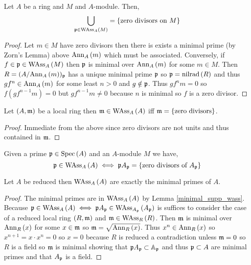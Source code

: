 \documentclass[12pt]{article}
\begin{document}
\begin{lemma}
Let $A$ be a ring and $M$ and $A$-module. Then,
\[ \bigcup_{\mathfrak{p} \in \mathrm{WAss}_{A}\left(M \right)} = \{ \text{zero divisors on } M \} \]
\end{lemma}

\begin{proof}
Let $m \in M$ have zero divisors then there is exists a minimal prime (by Zorn's Lemma) above $\mathrm{Ann}_{A}\left(m\right)$ which must be associated. Conversely, if $f \in \mathfrak{p} \in \mathrm{WAss}_{A}\left(M \right)$ then $\mathfrak{p}$ is minimal over $\mathrm{Ann}_{A}\left(m\right)$ for some $m \in M$. Then $R = (A / \mathrm{Ann}_{A}\left(m\right))_{\mathfrak{p}}$ has a unique minimal prime $\mathfrak{p}$ so $\mathfrak{p} = \mathrm{nilrad}\left( R \right)$ and thus $g f^n \in \mathrm{Ann}_{A}\left(m\right)$ for some least $n > 0$ and $g \notin \mathfrak{p}$. Thus $g f^n m = 0$ so $f (g f^{n-1} m) = 0$ but $g f^{n-1} m \neq 0$ because $n$ is minimal so $f$ is a zero divisor.
\end{proof}

\begin{prop}
Let $(A, \mathfrak{m})$ be a local ring then $\mathfrak{m} \in \mathrm{WAss}_{A}\left(A \right)$ iff $\mathfrak{m} = \{ \text{zero divisors} \}$.
\end{prop}

\begin{proof}
Immediate from the above since zero divisors are not units and thus contained in $\mathfrak{m}$.
\end{proof}

\begin{cor}
Given a prime $\mathfrak{p} \in \mathrm{Spec}\left( A \right)$ and an $A$-module $M$ we have,
\[ \mathfrak{p} \in \mathrm{WAss}_{A}\left(A \right) \iff \mathfrak{p} A_{\mathfrak{p}} = \{ \text{zero divisors of } A_{\mathfrak{p}} \} \]
\end{cor}

\begin{prop}
Let $A$ be reduced then $\mathrm{WAss}_{A}\left(A \right)$ are exactly the minimal primes of $A$.
\end{prop}

\begin{proof}
The minimal primes are in $\mathrm{WAss}_{A}\left(A \right)$ by Lemma \ref{minimal_supp_wass}. Because $\mathfrak{p} \in \mathrm{WAss}_{A}\left(A \right) \iff \mathfrak{p} A_{\mathfrak{p}} \in \mathrm{WAss}_{A_{\mathfrak{p}}}\left(A_{\mathfrak{p}} \right)$ is suffices to consider the case of a reduced local ring $(R, \mathfrak{m})$ and $\mathfrak{m} \in \mathrm{WAss}_{R}\left(R \right)$. Then $\mathfrak{m}$ is minimal over $\mathrm{Ann}_{R}\left(x\right)$ for some $x \in \mathfrak{m}$ so $\mathfrak{m} = \sqrt{\mathrm{Ann}_{R}\left(x\right)}$. Thus $x^n \in \mathrm{Ann}_{R}\left(x\right)$ so $x^{n+1} = x \cdot x^n = 0$ so $x = 0$ because $R$ is reduced a contradiction unless $\mathfrak{m} = 0$ so $R$ is a field so $\mathfrak{m}$ is minimal showing that $\mathfrak{p} A_{\mathfrak{p}} \subset \mathbb{A}_{\mathfrak{p}}$ and thus $\mathfrak{p} \subset A$ are minimal primes and that $A_{\mathfrak{p}}$ is a field. 
\end{proof}
\end{document}
